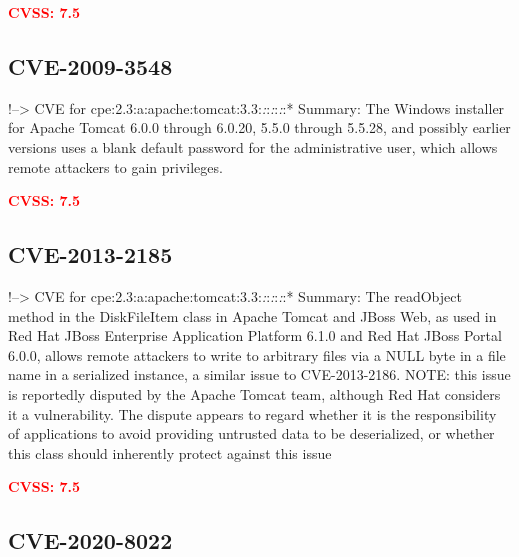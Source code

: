 \documentclass[a4paper, 12pt]{article}
\begin{document}
\textbf{\textcolor{red}{CVSS: 7.5}}

\hypertarget{cve-2009-3548}{%
\subsection{CVE-2009-3548}\label{cve-2009-3548}}

!--\textgreater{} CVE for
cpe:2.3:a:apache:tomcat:3.3:\emph{:}:\emph{:}:\emph{:}:* Summary: The
Windows installer for Apache Tomcat 6.0.0 through 6.0.20, 5.5.0 through
5.5.28, and possibly earlier versions uses a blank default password for
the administrative user, which allows remote attackers to gain
privileges.

\textbf{\textcolor{red}{CVSS: 7.5}}

\hypertarget{cve-2013-2185}{%
\subsection{CVE-2013-2185}\label{cve-2013-2185}}

!--\textgreater{} CVE for
cpe:2.3:a:apache:tomcat:3.3:\emph{:}:\emph{:}:\emph{:}:* Summary: The
readObject method in the DiskFileItem class in Apache Tomcat and JBoss
Web, as used in Red Hat JBoss Enterprise Application Platform 6.1.0 and
Red Hat JBoss Portal 6.0.0, allows remote attackers to write to
arbitrary files via a NULL byte in a file name in a serialized instance,
a similar issue to CVE-2013-2186. NOTE: this issue is reportedly
disputed by the Apache Tomcat team, although Red Hat considers it a
vulnerability. The dispute appears to regard whether it is the
responsibility of applications to avoid providing untrusted data to be
deserialized, or whether this class should inherently protect against
this issue

\textbf{\textcolor{red}{CVSS: 7.5}}

\hypertarget{cve-2020-8022}{%
\subsection{CVE-2020-8022}\label{cve-2020-8022}}
\end{document}
